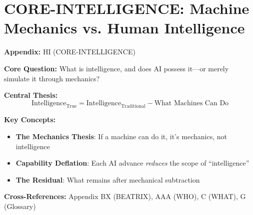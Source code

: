 \chapter{CORE-INTELLIGENCE: Machine Mechanics vs. Human Intelligence}
\label{app:core-intelligence}


\begin{tcolorbox}[colback=blue!5!white, colframe=blue!75!black,
    title=Quick Reference: Appendix HI]

\textbf{Appendix:} HI (CORE-INTELLIGENCE)

\textbf{Core Question:} What is intelligence, and does AI possess it---or merely simulate it through mechanics?

\textbf{Central Thesis:}
\begin{equation}
\text{Intelligence}_{\text{True}} = \text{Intelligence}_{\text{Traditional}} - \text{What Machines Can Do}
\label{eq:hi-core}
\end{equation}

\textbf{Key Concepts:}
\begin{itemize}[nosep]
\item \textbf{The Mechanics Thesis}: If a machine can do it, it's mechanics, not intelligence
\item \textbf{Capability Deflation}: Each AI advance \textit{reduces} the scope of ``intelligence''
\item \textbf{The Residual}: What remains after mechanical subtraction
\end{itemize}

\textbf{Cross-References:} Appendix BX (BEATRIX), AAA (WHO), C (WHAT), G (Glossary)
\end{tcolorbox}


\begin{abstract}
This appendix develops the \textbf{Mechanics Thesis}: the claim that what machines can demonstrably perform is, by definition, not intelligence but mechanics. We begin with traditional definitions of intelligence (Turing, Gardner, Spearman) and systematically subtract what Large Language Models and other AI systems can now perform. The residual---what remains after this subtraction---represents \textit{true} intelligence. This analysis has profound implications for how we understand human cognition, the limits of AI, and the role of BEATRIX as a \textit{mechanical amplifier} of human intelligence rather than a replacement for it.
\end{abstract}


